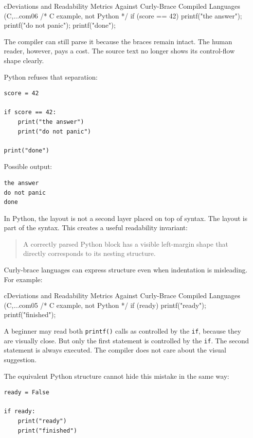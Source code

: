\begin{codebox}[]{c}{Deviations and Readability Metrics Against Curly-Brace Compiled Languages (C,...}{com06}
/* C example, not Python */
if (score == 42) {
printf("the answer\n");
printf("do not panic\n");
}
printf("done\n");
\end{codebox}


The compiler can still parse it because the braces remain intact. The human reader, however, pays a cost. The source text no longer shows its control-flow shape clearly.

Python refuses that separation:

\begin{verbatim}
score = 42

if score == 42:
    print("the answer")
    print("do not panic")

print("done")
\end{verbatim}

Possible output:

\begin{verbatim}
the answer
do not panic
done
\end{verbatim}

In Python, the layout is not a second layer placed on top of syntax. The layout is part of the syntax. This creates a useful readability invariant:

\begin{quote}
A correctly parsed Python block has a visible left-margin shape that directly corresponds to its nesting structure.
\end{quote}

Curly-brace languages can express structure even when indentation is misleading. For example:

\begin{codebox}[]{c}{Deviations and Readability Metrics Against Curly-Brace Compiled Languages (C,...}{com05}
/* C example, not Python */
if (ready)
    printf("ready\n");
    printf("finished\n");
\end{codebox}


A beginner may read both \texttt{printf()} calls as controlled by the \texttt{if}, because they are visually close. But only the first statement is controlled by the \texttt{if}. The second statement is always executed. The compiler does not care about the visual suggestion.

The equivalent Python structure cannot hide this mistake in the same way:

\begin{verbatim}
ready = False

if ready:
    print("ready")
    print("finished")
\end{verbatim}

